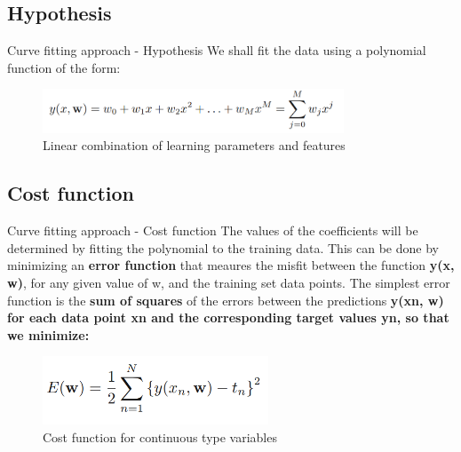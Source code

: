 \documentclass{beamer}
\begin{document}
\subsection{Hypothesis}
\begin{frame}{Curve fitting approach - Hypothesis}
We shall fit the data using a polynomial function of the form: \\
\begin{figure}
  \centering
    \includegraphics[width=0.80\textwidth]{hypothesis}
  		\caption{ Linear combination of learning parameters and features }
    \label{hypothesis}
 \end{figure}
\end{frame}

\subsection{Cost function}
\begin{frame}{Curve fitting approach - Cost function}
The values of the coefficients will be determined by fitting the polynomial to the training data. This can be done by minimizing an \textbf{error function} that meaures the misfit between the function \textbf{y(x, w)}, for any given value of w, and the training set data points. The simplest error function is the \textbf{sum of squares} of the errors between the predictions \textbf{y(xn, w) for each data point xn and the corresponding target values yn, so that we minimize: }  \\
\begin{figure}
  \centering
    \includegraphics[width=0.60\textwidth]{cost_function}
  		\caption{ Cost function for continuous type variables }
    \label{cost_function}
 \end{figure}
\end{frame}
\end{document}
